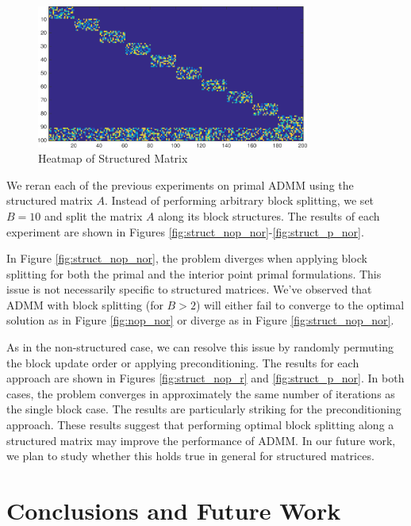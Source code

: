 \documentclass{article}
\begin{document}
{\begin{figure}[h]
	\centering
	\includegraphics[width=0.8\textwidth]{../figures/struct_prob.png}
	\caption{Heatmap of Structured Matrix}
	\label{fig:struct_prob}
\end{figure}

We reran each of the previous experiments on primal ADMM using the structured matrix $A$. Instead of performing arbitrary block splitting, we set $B=10$ and split the matrix $A$ along its block structures. The results of each experiment are shown in Figures \ref{fig:struct_nop_nor}-\ref{fig:struct_p_nor}.

In Figure \ref{fig:struct_nop_nor}, the problem diverges when applying block splitting for both the primal and the interior point primal formulations. This issue is not necessarily specific to structured matrices. We've observed that ADMM with block splitting (for $B>2$) will either fail to converge to the optimal solution as in Figure \ref{fig:nop_nor} or diverge as in Figure \ref{fig:struct_nop_nor}. 


As in the non-structured case, we can resolve this issue by randomly permuting the block update order or applying preconditioning. The results for each approach are shown in Figures \ref{fig:struct_nop_r} and \ref{fig:struct_p_nor}. In both cases, the problem converges in approximately the same number of iterations as the single block case. The results are particularly striking for the preconditioning approach. These results suggest that performing optimal block splitting along a structured matrix may improve the performance of ADMM. In our future work, we plan to study whether this holds true in general for structured matrices.

\vspace{0.5in}
\section{Conclusions and Future Work}

}
\end{document}
